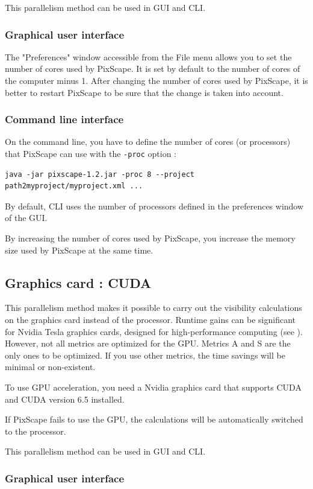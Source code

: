 \documentclass{report}
\begin{document}
This parallelism method can be used in GUI and CLI.

\subsubsection{Graphical user interface}
The "Preferences" window accessible from the File menu allows you to set the number of cores used by PixScape. It is set by default to the number of cores of the computer minus 1. After changing the number of cores used by PixScape, it is better to restart PixScape to be sure that the change is taken into account.

\subsubsection{Command line interface}
On the command line, you have to define the number of cores (or processors) that PixScape can use with the \verb|-proc| option :
\begin{Verbatim}
java -jar pixscape-1.2.jar -proc 8 --project path2myproject/myproject.xml ...
\end{Verbatim}
By default, CLI uses the number of processors defined in the preferences window of the GUI.

By increasing the number of cores used by PixScape, you increase the memory size used by PixScape at the same time.


\subsection{Graphics card : CUDA}
\label{cuda}
This parallelism method makes it possible to carry out the visibility calculations on the graphics card instead of the processor. Runtime gains can be significant for Nvidia Tesla graphics cards, designed for high-performance computing (see ). However, not all metrics are optimized for the GPU. Metrics A and S are the only ones to be optimized. If you use other metrics, the time savings will be minimal or non-existent.

To use GPU acceleration, you need a Nvidia graphics card that supports CUDA and CUDA version 6.5 installed. 

If PixScape fails to use the GPU, the calculations will be automatically switched to the processor.

This parallelism method can be used in GUI and CLI.

\subsubsection{Graphical user interface}
\end{document}

